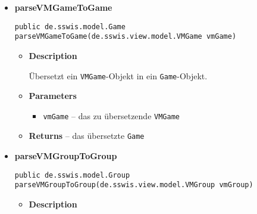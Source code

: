 {{{{{{{\begin{itemize}
{\begin{itemize}
{Übersetzt ein \texttt{\small VMConfiguration}-Objekt in eine Sammlung an \texttt{\small Configuration}-Objekten. Im Falle einer Mehrfachkonfiguration enthält die zurückgegebene Sammlung die \texttt{\small n} Einzelkonfigurationen.
}
\item{
{\bf  Parameters}
  \begin{itemize}
   \item{
\texttt{vmConfig} -- die zu übersetzende \texttt{\small VMConfiguration}}
  \end{itemize}
}%
\item{{\bf  Returns} -- 
die übersetzte \texttt{\small Collection} 
}%
\end{itemize}
}%
\item{ 
\hypertarget{de.sswis.controller.ModelParser.parseVMGameToGame(de.sswis.view.model.VMGame)}{{\bf  parseVMGameToGame}\\}
\begin{lstlisting}[frame=none]
public de.sswis.model.Game parseVMGameToGame(de.sswis.view.model.VMGame vmGame)\end{lstlisting} %
\begin{itemize}
\item{
{\bf  Description}

Übersetzt ein \texttt{\small VMGame}-Objekt in ein \texttt{\small Game}-Objekt.
}
\item{
{\bf  Parameters}
  \begin{itemize}
   \item{
\texttt{vmGame} -- das zu übersetzende \texttt{\small VMGame}}
  \end{itemize}
}%
\item{{\bf  Returns} -- 
das übersetzte \texttt{\small Game} 
}%
\end{itemize}
}%
\item{ 
\hypertarget{de.sswis.controller.ModelParser.parseVMGroupToGroup(de.sswis.view.model.VMGroup)}{{\bf  parseVMGroupToGroup}\\}
\begin{lstlisting}[frame=none]
public de.sswis.model.Group parseVMGroupToGroup(de.sswis.view.model.VMGroup vmGroup)\end{lstlisting} %
\begin{itemize}
\item{
{\bf  Description}

}
\end{itemize}}
\end{itemize}}}}}}}}
